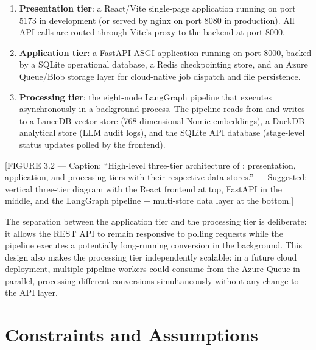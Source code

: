 \begin{enumerate}
  \item \textbf{Presentation tier}: a React/Vite single-page application
    running on port 5173 in development (or served by nginx on port 8080 in
    production). All API calls are routed through Vite's proxy to the backend
    at port 8000.
  \item \textbf{Application tier}: a FastAPI ASGI application running on port
    8000, backed by a SQLite operational database, a Redis checkpointing store,
    and an Azure Queue/Blob storage layer for cloud-native job dispatch and
    file persistence.
  \item \textbf{Processing tier}: the eight-node LangGraph pipeline that
    executes asynchronously in a background process. The pipeline reads from
    and writes to a LanceDB vector store (768-dimensional Nomic embeddings),
    a DuckDB analytical store (LLM audit logs), and the SQLite API database
    (stage-level status updates polled by the frontend).
\end{enumerate}

[FIGURE 3.2 --- Caption: ``High-level three-tier architecture of \codara{}:
presentation, application, and processing tiers with their respective data
stores.'' --- Suggested: vertical three-tier diagram with the React frontend
at top, FastAPI in the middle, and the LangGraph pipeline + multi-store data
layer at the bottom.]

The separation between the application tier and the processing tier is
deliberate: it allows the REST API to remain responsive to polling requests
while the pipeline executes a potentially long-running conversion in the
background. This design also makes the processing tier independently scalable:
in a future cloud deployment, multiple pipeline workers could consume from the
Azure Queue in parallel, processing different conversions simultaneously without
any change to the API layer.

\section{Constraints and Assumptions}
\label{sec:constraints}

